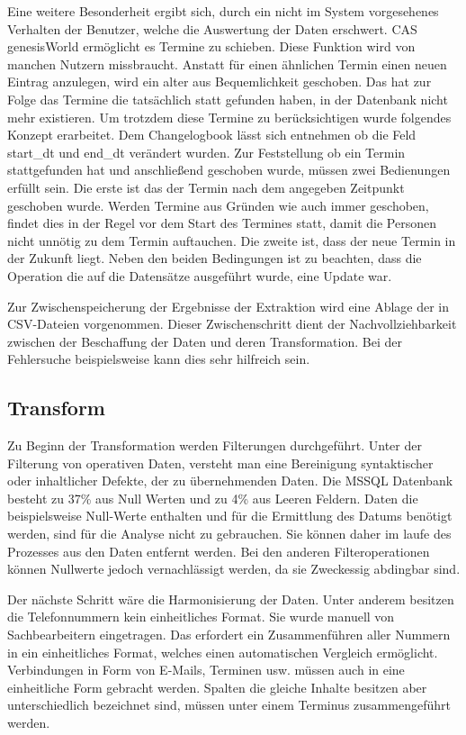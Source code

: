 Eine weitere Besonderheit ergibt sich, durch ein nicht im System vorgesehenes Verhalten der Benutzer, welche die Auswertung der Daten erschwert. CAS genesisWorld ermöglicht es Termine zu schieben. Diese Funktion wird von manchen Nutzern missbraucht. Anstatt für einen ähnlichen Termin einen neuen Eintrag anzulegen, wird ein alter aus Bequemlichkeit geschoben. Das hat zur Folge das Termine die tatsächlich statt gefunden haben, in der Datenbank nicht mehr existieren. Um trotzdem diese Termine zu berücksichtigen wurde folgendes Konzept erarbeitet. Dem Changelogbook lässt sich entnehmen ob die Feld start\_dt und end\_dt verändert wurden. Zur Feststellung ob ein Termin stattgefunden hat und anschließend geschoben wurde, müssen zwei Bedienungen erfüllt sein. Die erste ist das der Termin nach dem angegeben Zeitpunkt geschoben wurde. Werden Termine aus Gründen wie auch immer geschoben, findet dies in der Regel vor dem Start des Termines statt, damit die Personen nicht unnötig zu dem Termin auftauchen. Die zweite ist, dass der neue Termin in der Zukunft liegt. Neben den beiden Bedingungen ist zu beachten, dass die Operation die auf die Datensätze ausgeführt wurde, eine Update war.

Zur Zwischenspeicherung der Ergebnisse der Extraktion wird eine Ablage der in CSV-Dateien vorgenommen. Dieser Zwischenschritt dient der Nachvollziehbarkeit zwischen der Beschaffung der Daten und deren Transformation. Bei der Fehlersuche beispielsweise kann dies sehr hilfreich sein.  

\subsection{Transform}

Zu Beginn der Transformation werden Filterungen durchgeführt. Unter der Filterung von operativen Daten, versteht man eine Bereinigung syntaktischer oder inhaltlicher Defekte, der zu übernehmenden Daten. Die MSSQL Datenbank besteht zu 37\% aus Null Werten und zu 4\% aus Leeren Feldern. Daten die beispielsweise Null-Werte enthalten und für die Ermittlung des Datums benötigt werden, sind für die Analyse nicht zu gebrauchen. Sie können daher im laufe des Prozesses aus den Daten entfernt werden. Bei den anderen Filteroperationen können Nullwerte jedoch vernachlässigt werden, da sie Zweckessig abdingbar sind.

Der nächste Schritt wäre die Harmonisierung der Daten. Unter anderem besitzen die Telefonnummern kein einheitliches Format. Sie wurde manuell von Sachbearbeitern eingetragen. Das erfordert ein Zusammenführen aller Nummern in ein einheitliches Format, welches einen automatischen Vergleich ermöglicht. Verbindungen in Form von E-Mails, Terminen usw. müssen auch in eine einheitliche Form gebracht werden. Spalten die gleiche Inhalte besitzen aber unterschiedlich bezeichnet sind, müssen unter einem Terminus zusammengeführt werden. 


